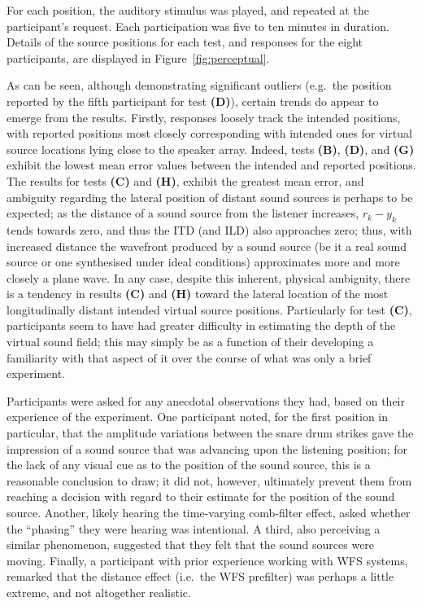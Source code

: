 \documentclass[utf8]{FrontiersinHarvard}
\newcommand{\figref}[1]{Figure~\ref{#1}}
\begin{document}
    For each position, the auditory stimulus was played, and repeated at the
    participant's request.
    Each participation was five to ten minutes in duration.
    Details of the source positions for each test, and responses for the eight
    participants, are displayed in \figref{fig:perceptual}.

    As can be seen, although demonstrating significant outliers (e.g.\ the
    position reported by the fifth participant for test \textbf{(D)}), certain
    trends do appear to emerge from the results.
    Firstly, responses loosely track the intended positions, with reported
    positions most closely corresponding with intended ones for virtual source
    locations lying close to the speaker array.
    Indeed, tests \textbf{(B)}, \textbf{(D)}, and \textbf{(G)} exhibit the
    lowest mean error values between the intended and reported positions.
    The results for tests \textbf{(C)} and \textbf{(H)}, exhibit the greatest
    mean error, and ambiguity regarding the lateral position of distant sound
    sources is perhaps to be expected;
    as the distance of a sound source from the listener increases, $r_k - y_k$
    tends towards zero, and thus the ITD (and ILD) also approaches zero;
    thus, with increased distance the wavefront produced by a sound source (be
    it a real sound source or one synthesised under ideal conditions)
    approximates more and more closely a plane wave.
    In any case, despite this inherent, physical ambiguity, there is a tendency
    in results \textbf{(C)} and \textbf{(H)} toward the lateral location of the
    most longitudinally distant intended virtual source positions.
    Particularly for test \textbf{(C)}, participants seem to have had greater
    difficulty in estimating the depth of the virtual sound field; this may
    simply be as a function of their developing a familiarity with that aspect
    of it over the course of what was only a brief experiment.

    Participants were asked for any anecdotal observations they had, based on their
    experience of the experiment.
    One participant noted, for the first position in particular, that the amplitude
    variations between the snare drum strikes gave the impression of a sound source
    that was advancing upon the listening position; for the lack of any visual cue
    as to the position of the sound source, this is a reasonable conclusion to draw;
    it did not, however, ultimately prevent them from reaching a decision with
    regard to their estimate for the position of the sound source.
    Another, likely hearing the time-varying comb-filter effect, asked whether the
    ``phasing'' they were hearing was intentional.
    A third, also perceiving a similar phenomenon, suggested that they
    felt that the sound sources were moving.
    Finally, a participant with prior experience working with WFS systems, remarked
    that the distance effect (i.e.\ the WFS prefilter) was perhaps a little extreme,
    and not altogether realistic.
\end{document}

